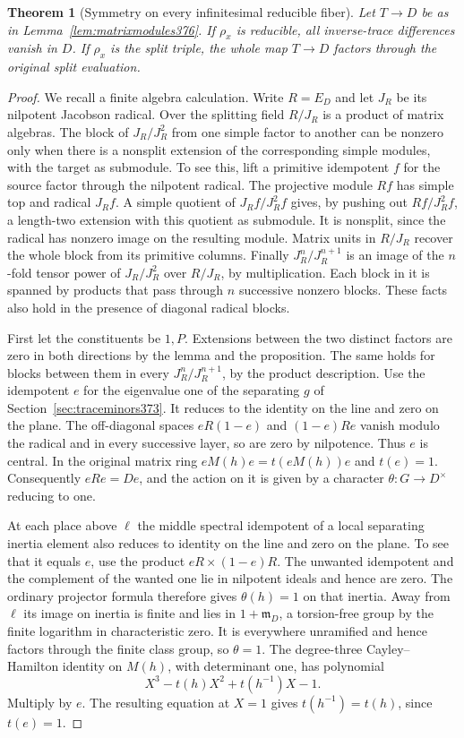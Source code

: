\documentclass[a4paper,11pt]{article}
\newtheorem{theorem}[proposition]{Theorem}
\theoremstyle{definition}
\theoremstyle{remark}
\numberwithin{equation}{section}
\begin{document}
\begin{theorem}[Symmetry on every infinitesimal reducible fiber]
\label{thm:reduciblefiber376}
Let \(T\to D\) be as in Lemma~\ref{lem:matrixmodules376}.
If \(\rho_x\) is reducible, all inverse-trace differences
vanish in \(D\). If \(\rho_x\) is the split triple, the whole
map \(T\to D\) factors through the original split evaluation.
\end{theorem}
\begin{proof}
We recall a finite algebra calculation. Write \(R=E_D\)
and let \(J_R\) be its nilpotent Jacobson radical.
Over the splitting field \(R/J_R\) is a product of matrix
algebras. The block of \(J_R/J_R^2\) from one simple factor
to another can be nonzero only when there is a nonsplit
extension of the corresponding simple modules, with the
target as submodule. To see this, lift a primitive idempotent
\(f\) for the source factor through the nilpotent radical.
The projective module \(Rf\) has simple top and radical
\(J_R f\). A simple quotient of \(J_R f/J_R^2 f\) gives,
by pushing out \(Rf/J_R^2 f\), a length-two extension with
this quotient as submodule. It is nonsplit, since the
radical has nonzero image on the resulting module. Matrix
units in \(R/J_R\) recover the whole block from its primitive
columns. Finally \(J_R^n/J_R^{n+1}\) is an image of the
\(n\)-fold tensor power of \(J_R/J_R^2\) over \(R/J_R\),
by multiplication. Each block in it is spanned by products
that pass through \(n\) successive nonzero blocks. These
facts also hold in the presence of diagonal radical blocks.

First let the constituents be \(1,P\). Extensions between
the two distinct factors are zero in both directions by
the lemma and the proposition. The same holds for blocks
between them in every \(J_R^n/J_R^{n+1}\), by the product
description. Use the idempotent \(e\) for the eigenvalue
one of the separating \(g\) of Section~\ref{sec:traceminors373}.
It reduces to the identity on the line and zero on the plane.
The off-diagonal spaces \(eR(1-e)\) and \((1-e)Re\) vanish
modulo the radical and in every successive layer, so are
zero by nilpotence. Thus \(e\) is central. In the original
matrix ring \(eM(h)e=t(eM(h))e\) and \(t(e)=1\).
Consequently \(eRe=De\), and the action on it is given by
a character \(\theta:G\to D^\times\) reducing to one.

At each place above \(\ell\) the middle spectral idempotent
of a local separating inertia element also reduces to
identity on the line and zero on the plane. To see that it equals \(e\), use the product \(eR\times(1-e)R\). The unwanted idempotent
and the complement of the wanted one lie in nilpotent
ideals and hence are zero. The ordinary projector formula
therefore gives \(\theta(h)=1\) on that inertia. Away from
\(\ell\) its image on inertia is finite and lies in
\(1+\mathfrak m_D\), a torsion-free group by the finite
logarithm in characteristic zero. It is everywhere
unramified and hence factors through the finite class
group, so \(\theta=1\). The degree-three Cayley--Hamilton
identity on \(M(h)\), with determinant one, has polynomial
\[
               X^3-t(h)X^2+t(h^{-1})X-1 .
\]
Multiply by \(e\). The resulting equation at \(X=1\)
gives \(t(h^{-1})=t(h)\), since \(t(e)=1\).


\end{proof}
\end{document}
